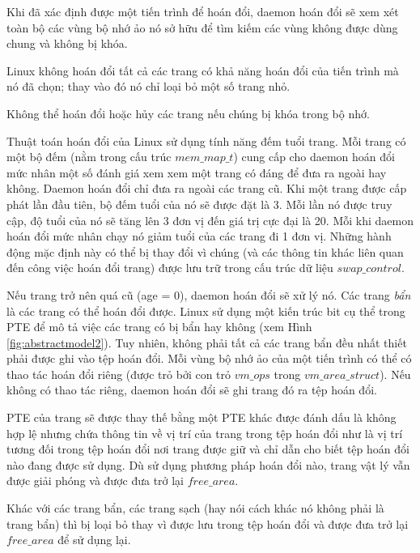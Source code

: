 \documentclass{article}
\begin{document}
Khi đã xác định được một tiến trình để hoán đổi, daemon hoán đổi sẽ xem xét toàn bộ các vùng bộ nhớ ảo nó sở hữu để tìm kiếm các vùng không được dùng chung và không bị khóa.\vspace{1em}

Linux không hoán đổi tất cả các trang có khả năng hoán đổi của tiến trình mà nó đã chọn; thay vào đó nó chỉ loại bỏ một số trang nhỏ.\vspace{1em}

Không thể hoán đổi hoặc hủy các trang nếu chúng bị khóa trong bộ nhớ.\vspace{1em}

Thuật toán hoán đổi của Linux sử dụng tính năng đếm tuổi trang. Mỗi trang có một bộ đếm (nằm trong cấu trúc $mem\_map\_t$) cung cấp cho daemon hoán đổi mức nhân một số đánh giá xem xem một trang có đáng để đưa ra ngoài hay không. Daemon hoán đổi chỉ đưa ra ngoài các trang cũ. Khi một trang được cấp phát lần đầu tiên, bộ đếm tuổi của nó sẽ được đặt là 3. Mỗi lần nó được truy cập, độ tuổi của nó sẽ tăng lên 3 đơn vị đến giá trị cực đại là 20. Mỗi khi daemon hoán đổi mức nhân chạy nó giảm tuổi của các trang đi 1 đơn vị. Những hành động mặc định này có thể bị thay đổi vì chúng (và các thông tin khác liên quan đến công việc hoán đổi trang) được lưu trữ trong cấu trúc dữ liệu $swap\_control$.\vspace{1em}

Nếu trang trở nên quá cũ (age = 0), daemon hoán đổi sẽ xử lý nó. Các trang \textit{bẩn} là các trang có thể hoán đổi được. Linux sử dụng một kiến trúc bit cụ thể trong PTE để mô tả việc các trang có bị bẩn hay không (xem Hình \ref{fig:abstractmodel2}). Tuy nhiên, không phải tất cả các trang bẩn đều nhất thiết phải được ghi vào tệp hoán đổi. Mỗi vùng bộ nhớ ảo của một tiến trình có thể có thao tác hoán đổi riêng (được trỏ bởi con trỏ $vm\_ops$ trong $vm\_area\_struct$). Nếu không có thao tác riêng, daemon hoán đổi sẽ ghi trang đó ra tệp hoán đổi.\vspace{1em}

PTE của trang sẽ được thay thế bằng một PTE khác được đánh dấu là không hợp lệ nhưng chứa thông tin về vị trí của trang trong tệp hoán đổi như là vị trí tương đối trong tệp hoán đổi nơi trang được giữ và chỉ dẫn cho biết tệp hoán đổi nào đang được sử dụng. Dù sử dụng phương pháp hoán đổi nào, trang vật lý vẫn được giải phóng và được đưa trở lại $free\_area$. \vspace{1em}

Khác với các trang bẩn, các trang sạch (hay nói cách khác nó không phải là trang bẩn) thì bị loại bỏ thay vì được lưu trong tệp hoán đổi và được đưa trở lại $free\_area$ để sử dụng lại.
\end{document}
